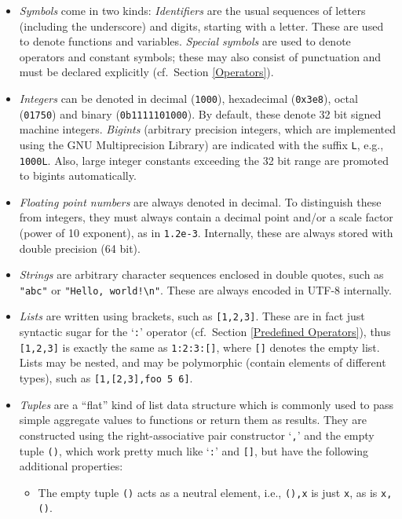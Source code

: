\documentclass[a4paper,12pt]{article}
\begin{document}
\begin{itemize}
\item \emph{Symbols} come in two kinds: \emph{Identifiers} are the usual sequences of letters (including the underscore) and digits, starting with a letter. These are used to denote functions and variables. \emph{Special symbols} are used to denote operators and constant symbols; these may also consist of punctuation and must be declared explicitly (cf.\ Section \ref{Operators}).
\item \emph{Integers} can be denoted in decimal (\verb|1000|), hexadecimal (\verb|0x3e8|), octal (\verb|01750|) and binary (\verb|0b1111101000|). By default, these denote 32 bit signed machine integers. \emph{Bigints} (arbitrary precision integers, which are implemented using the GNU Multiprecision Library) are indicated with the suffix \verb|L|, e.g., \verb|1000L|. Also, large integer constants exceeding the 32 bit range are promoted to bigints automatically.
\item \emph{Floating point numbers} are always denoted in decimal. To distinguish these from integers, they must always contain a decimal point and/or a scale factor (power of 10 exponent), as in \verb|1.2e-3|. Internally, these are always stored with double precision (64 bit).
\item \emph{Strings} are arbitrary character sequences enclosed in double quotes, such as \verb|"abc"| or \lstinline{"Hello, world!\n"}. These are always encoded in UTF-8 internally.
\item \emph{Lists} are written using brackets, such as \verb|[1,2,3]|. These are in fact just syntactic sugar for the `\verb|:|' operator (cf.\ Section \ref{Predefined Operators}), thus \verb|[1,2,3]| is exactly the same as \verb|1:2:3:[]|, where \verb|[]| denotes the empty list. Lists may be nested, and may be polymorphic (contain elements of different types), such as \lstinline{[1,[2,3],foo 5 6]}.
\item \emph{Tuples} are a ``flat'' kind of list data structure which is commonly used to pass simple aggregate values to functions or return them as results. They are constructed using the right-associative pair constructor `\verb|,|' and the empty tuple \verb|()|, which work pretty much like `\verb|:|' and \verb|[]|, but have the following additional properties:
\begin{itemize}
\item The empty tuple \verb|()| acts as a neutral element, i.e., \verb|(),x| is just \verb|x|, as is \verb|x,()|.

\end{itemize}
\end{itemize}
\end{document}
